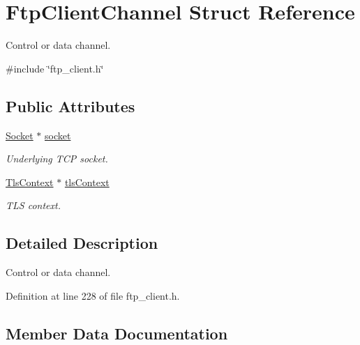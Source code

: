 \hypertarget{structFtpClientChannel}{}\section{Ftp\+Client\+Channel Struct Reference}
\label{structFtpClientChannel}


Control or data channel.  




{\ttfamily \#include \char`\"{}ftp\+\_\+client.\+h\char`\"{}}

\subsection*{Public Attributes}
\begin{DoxyCompactItemize}
\item 
\hyperlink{socket_8h_aa85acfb0fa336ef495e6ba87fb88fc48}{Socket} $\ast$ \hyperlink{structFtpClientChannel_a41c50a1a7b2155a449f0c2b495563de1}{socket}
\begin{DoxyCompactList}\small\item\em Underlying T\+CP socket. \end{DoxyCompactList}\item 
\hyperlink{tls_8h_ac09f7a286c0cdf9b07ee1edd107946f5}{Tls\+Context} $\ast$ \hyperlink{structFtpClientChannel_aac12ca144cff862f259dbb77ee84d9be}{tls\+Context}
\begin{DoxyCompactList}\small\item\em T\+LS context. \end{DoxyCompactList}\end{DoxyCompactItemize}


\subsection{Detailed Description}
Control or data channel. 

Definition at line 228 of file ftp\+\_\+client.\+h.



\subsection{Member Data Documentation}
\mbox{\label{structFtpClientChannel_a41c50a1a7b2155a449f0c2b495563de1}} 
